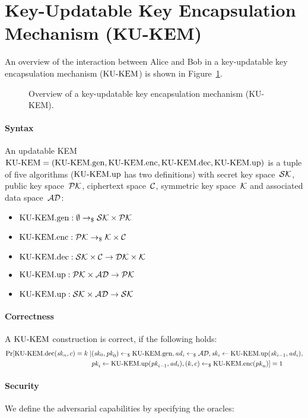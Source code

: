 \section{Key-Updatable Key Encapsulation Mechanism (KU-KEM)}

An overview of the interaction between Alice and Bob in a key-updatable key encapsulation mechanism ($\KUKEM$) is shown in Figure~\ref{fig:kukem:overview}. 

\begin{figure}[!ht]
    \centering
    
    \caption{Overview of a key-updatable key encapsulation mechanism (KU-KEM).}
    \label{fig:kukem:overview}
\end{figure}

\paragraph{Syntax} An updatable KEM $\KUKEM=(\KUKEMgen,\KUKEMenc,\KUKEMdec, \KUKEMup)$ is a tuple of five algorithms ($\KUKEMup$ has two definitions) with secret key space~$\sksp$, public key space~$\pksp$, ciphertext space~$\csp$, symmetric key space~$\ksp$ and associated data space~$\adsp$:

\begin{itemize}
    \item $\KUKEMgen: \emptyset \tor \sksp\times\pksp$
    \item $\KUKEMenc: \pksp \tor \ksp\times\csp$
    \item $\KUKEMdec: \sksp\times\csp \to \dksp\times\ksp$
    \item $\KUKEMup: \pksp\times\adsp\to\pksp$
    \item $\KUKEMup: \sksp\times\adsp\to\sksp$
\end{itemize}

\paragraph{Correctness} A $\KUKEM$ construction is correct, if the following holds:
\begin{align*}
    \Pr[\KUKEMdec(\sk_n,c)=k\mid&(\sk_0,\pk_0)\getsr\KUKEMgen, \ad_i\getsr\adsp, \sk_i\gets\KUKEMup(\sk_{i-1},\ad_i),\\
     &\pk_i\gets\KUKEMup(\pk_{i-1},\ad_i), (k,c)\getsr\KUKEMenc(\pk_n)] = 1
\end{align*}

\paragraph{Security} We define the adversarial capabilities by specifying the oracles:

